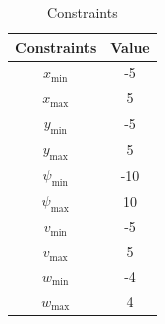 \begin{table}[H]
    \centering
    \begin{tabular}{|c|c|}
        \hline
        \textbf{Constraints} & \textbf{Value} \\
        \hline
        $x_{\text{min}}$ & -5 \\
        $x_{\text{max}}$ & 5 \\
        $y_{\text{min}}$ & -5 \\
        $y_{\text{max}}$ & 5 \\
        $\psi_{\text{min}}$ & -10 \\
        $\psi_{\text{max}}$ & 10 \\
        $v_{\text{min}}$ & -5 \\
        $v_{\text{max}}$ & 5 \\
        $w_{\text{min}}$ & -4 \\
        $w_{\text{max}}$ & 4 \\
        \hline
    \end{tabular}
    \caption{Constraints}
    \label{tab:constraints}
\end{table}